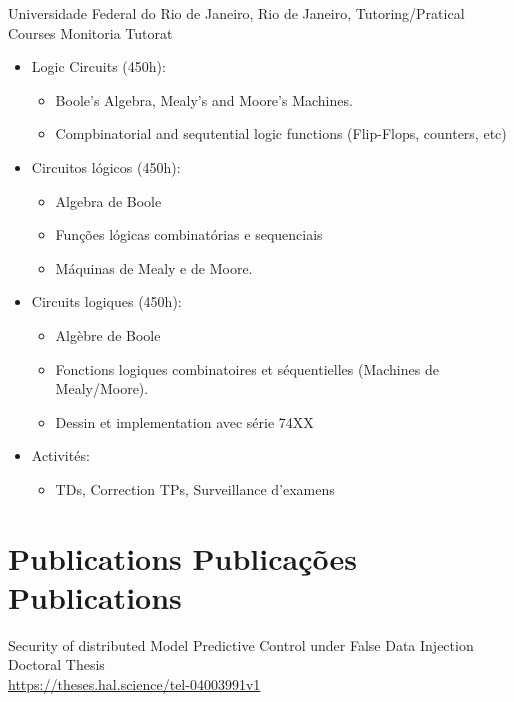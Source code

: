 {Universidade Federal do Rio de Janeiro, Rio de Janeiro, \brazil}
{\newline   \ml
  {Tutoring/Pratical Courses}
  {Monitoria}
  {Tutorat}
}
{}
{}
{
  \ml
  {
    \begin{itemize}
    \item Logic Circuits (450h):
      \begin{itemize}
      \item Boole's Algebra, Mealy's and Moore's Machines.
      \item Compbinatorial and sequtential logic functions (Flip-Flops, counters, etc)
      \end{itemize}
    \end{itemize}
  }
  {
    \begin{itemize}
    \item Circuitos lógicos (450h):
      \begin{itemize}
        \item Algebra de Boole
        \item Funções lógicas combinatórias e sequenciais
        \item Máquinas de Mealy e de Moore.
      \end{itemize}
    \end{itemize}
  }
  {
    \begin{itemize}
      \item Circuits logiques (450h):
      \begin{itemize}
        \item Algèbre de Boole
        \item Fonctions logiques combinatoires et séquentielles (Machines de Mealy/Moore).
        \item Dessin et implementation avec série 74XX
      \end{itemize}
    \end{itemize}
    \begin{itemize}
      \item Activités:
            \begin{itemize}
              \item TDs, Correction TPs, Surveillance d'examens
            \end{itemize}
    \end{itemize}
  }
}

\section{
  \ml
  {Publications}
  {Publicações}
  {Publications}
}
{Security of distributed Model Predictive Control under False Data Injection}
{}
{}{}{Doctoral Thesis\\\url{https://theses.hal.science/tel-04003991v1}}

